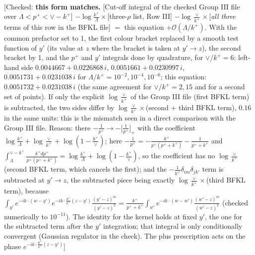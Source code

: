 \documentclass[9pt]{article}
\numberwithin{equation}{section}
\begin{document}
\begin{align}
\end{align} {\color{red}[Checked: \textbf{this form matches.} [Cut-off integral of the checked Group III file over $\Lambda<p^{+}<\vee-k^{+}$] $-\log\frac{k^{+}}{\Lambda}\times$[three-$\rho$ list, Row III] $-\log\frac{\vee}{k^{+}}\times$[\emph{all three} terms of this row in the BFKL file] $=$ this equation $+\mathcal{O}(\Lambda/k^{+})$. With the common prefactor set to 1, the first colour bracket replaced by a smooth test function of $y'$ (its value at $z$ where the bracket is taken at $y'\to z$), the second bracket by 1, and the $p^{+}$ and $y'$ integrals done by quadrature, for $\vee/k^{+}=6$: left-hand side $0.0044667+0.0226868\,i$, $0.0051661+0.0230997\,i$, $0.0051731+0.0231038\,i$ for $\Lambda/k^{+}=10^{-2},10^{-4},10^{-6}$; this equation: $0.0051732+0.0231038\,i$ (the same agreement for $\vee/k^{+}=2,15$ and for a second set of points). If only the explicit $\log\frac{\vee}{k^{+}}$ of the Group III file (first BFKL term) is subtracted, the two sides differ by $\log\frac{\vee}{k^{+}}\times$(second $+$ third BFKL term), $0.16$ in the same units: this is the mismatch seen in a direct comparison with the Group III file. Reason: there $-\frac{1}{p^{+}}\to-\big[\frac{1}{p^{+}}\big]_{+}$ with the coefficient $\log\frac{k^{+}}{\Lambda}+\log\frac{\vee}{k^{+}}+\log(1-\frac{k^{+}}{\vee})$; here $-\frac{1}{p^{+}}=-\frac{k^{+}}{p^{+}(p^{+}+k^{+})}-\frac{1}{p^{+}+k^{+}}$ and $\int_{\Lambda}^{\vee-k^{+}}\frac{k^{+}dp^{+}}{p^{+}(p^{+}+k^{+})}=\log\frac{k^{+}}{\Lambda}+\log(1-\frac{k^{+}}{\vee})$, so the coefficient has no $\log\frac{\vee}{k^{+}}$ (second BFKL term, which cancels the first); and the $-\frac{1}{k^{+}}\delta_{im}\delta_{jk'}$ term is subtracted at $y'\to z$, the subtracted piece being exactly $\log\frac{\vee}{k^{+}}\times$(third BFKL term), because $\int_{y'}e^{-ik\cdot(w-y')}e^{-ik\cdot\frac{p^{+}}{k^{+}}(z-y')}\frac{(y'-z)^{m}}{(y'-z)^{2}}=\frac{k^{+}}{p^{+}+k^{+}}\int_{w'}e^{-ik\cdot(w-w')}\frac{(w'-z)^{m}}{(w'-z)^{2}}$ (checked numerically to $10^{-11}$). The identity for the kernel holds at fixed $y'$, the one for the subtracted term after the $y'$ integration; that integral is only conditionally convergent (Gaussian regulator in the check). The plus prescription acts on the phase $e^{-ik\cdot\frac{p^{+}}{k^{+}}(z-y')}$]}\par\noindent
\end{document}
